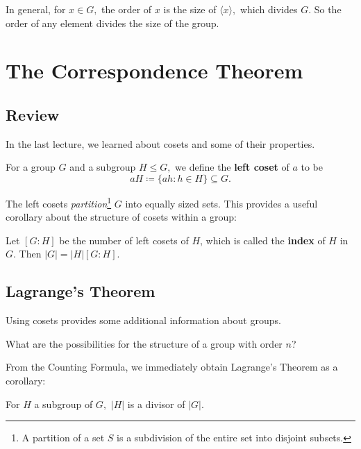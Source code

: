 In general, for $x \in G,$ the order of $x$ is the size of $\langle x \rangle,$ which divides $G.$ So the order of any element divides the size of the group. 

\newpage


\section{The Correspondence Theorem}
\subsection{Review}

In the last lecture, we learned about cosets and some of their properties. 

\begin{definition}
For a group $G$ and a subgroup $H \leq G,$ we define the \textbf{left coset} of $a$ to be 
\[
aH \coloneqq \{ah : h \in H\} \subseteq G.
\]
\end{definition}

The left cosets \emph{partition}\footnote{A partition of a set $S$ is a subdivision of the entire set into disjoint subsets.} $G$ into equally sized sets. This provides a useful corollary about the structure of cosets within a group:

\begin{corollary}
Let $[G:H]$ be the number of left cosets of $H$, which is called the \textbf{index} of $H$ in $G.$ Then $|G| = |H|[G:H]$.
\end{corollary}

\subsection{Lagrange's Theorem}
Using cosets provides some additional information about groups.
\begin{qq}
What are the possibilities for the structure of a group with order $n$?
\end{qq}

From the Counting Formula, we immediately obtain Lagrange's Theorem as a corollary:
\begin{theorem} 
For $H$ a subgroup of $G,$ $|H|$ is a divisor of $|G|.$
\end{theorem}

